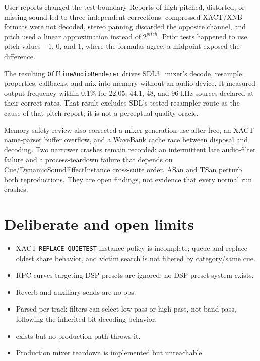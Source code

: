 \begin{historynote}{User reports changed the test boundary}
Reports of high-pitched, distorted, or missing sound led to three independent corrections:
compressed XACT/XNB formats were not decoded, stereo panning discarded the opposite channel,
and pitch used a linear approximation instead of $2^{pitch}$. Prior tests happened to use
pitch values $-1$, 0, and 1, where the formulas agree; a midpoint exposed the difference.

The resulting \texttt{OfflineAudioRenderer} drives SDL3\_mixer's decode, resample, properties,
callbacks, and mix into memory without an audio device. It measured output frequency within
0.1\% for 22.05, 44.1, 48, and 96 kHz sources declared at their correct rates. That result
excludes SDL's tested resampler route as the cause of that pitch report; it is not a perceptual
quality oracle.
\end{historynote}

Memory-safety review also corrected a mixer-generation use-after-free, an XACT name-parser
buffer overflow, and a WaveBank cache race between disposal and decoding. Two narrower crashes
remain recorded: an intermittent late audio-filter failure and a process-teardown failure that
depends on Cue/DynamicSoundEffectInstance cross-suite order. ASan and TSan perturb both
reproductions. They are open findings, not evidence that every normal run crashes.

\section{Deliberate and open limits}

\begin{itemize}
  \item XACT \texttt{REPLACE\_QUIETEST} instance policy is incomplete; queue and replace-oldest
        share behavior, and victim search is not filtered by category/same cue.
  \item RPC curves targeting DSP presets are ignored; no DSP preset system exists.
  \item Reverb and auxiliary sends are no-ops.
  \item Parsed per-track filters can select low-pass or high-pass, not band-pass, following the
        inherited bit-decoding behavior.
  \item {} exists but no production path throws it.
  \item Production mixer teardown is implemented but unreachable.
\end{itemize}


